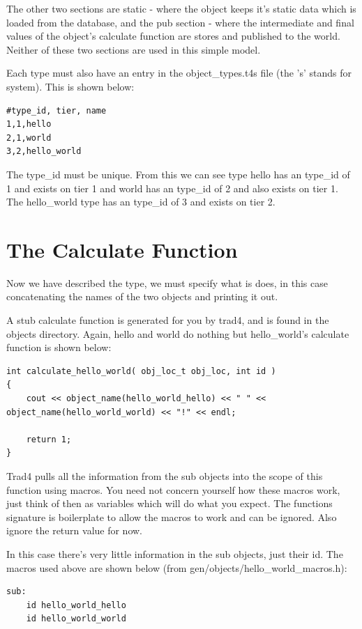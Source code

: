 \documentclass{report}
\begin{document}
The other two sections are static - where the object keeps it's static data which is loaded from the database, and the pub section - where the intermediate and final values of the object's calculate function are stores and published to the world. Neither of these two sections are used in this simple model.

Each type must also have an entry in the object_types.t4s file (the 's' stands for system). This is shown below:

\begin{verbatim}
#type_id, tier, name
1,1,hello
2,1,world
3,2,hello_world
\end{verbatim}


The type_id must be unique. From this we can see type hello has an type_id of 1 and exists on tier 1 and world has an type_id of 2 and also exists on tier 1. The hello_world type has an type_id of 3 and exists on tier 2.

\section{The Calculate Function}

Now we have described the type, we must specify what is does, in this case concatenating the names of the two objects and printing it out.

A stub calculate function is generated for you by trad4, and is found in the objects directory. Again, hello and world do nothing but hello_world's calculate function is shown below:

\begin{verbatim}
int calculate_hello_world( obj_loc_t obj_loc, int id )
{
    cout << object_name(hello_world_hello) << " " << object_name(hello_world_world) << "!" << endl;

    return 1;
}
\end{verbatim}

Trad4 pulls all the information from the sub objects into the scope of this function using macros. You need not concern yourself how these macros work, just think of then as variables which will do what you expect. The functions signature is boilerplate to allow the macros to work and can be ignored. Also ignore the return value for now.

In this case there's very little information in the sub objects, just their id. The macros used above are shown below (from gen/objects/hello_world_macros.h):

\begin{verbatim}
sub:
    id hello_world_hello
    id hello_world_world
\end{verbatim}
\end{document}

